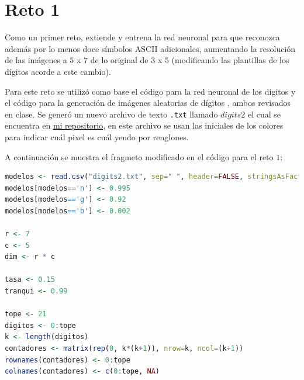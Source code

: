 \documentclass{article}
\begin{document}
\section{Reto 1}
Como un primer reto, extiende y entrena la red neuronal para que reconozca además por lo menos doce símbolos ASCII adicionales, aumentando la resolución de las imágenes a $5$ x $7$ de lo original de $3$ x $5$  (modificando las plantillas de los dígitos acorde a este cambio).
\bigskip

Para este reto se utilizó como base el código para la red neuronal de los digitos \citep{1} y el código para la generación de imágenes aleatorias de dígitos \citep{4}, ambos revisados en clase. Se generó un nuevo archivo de texto \texttt{.txt} llamado $digits2$ el cual se encuentra en \href{https://github.com/nataliaperez0/Simulation/tree/main/Tarea12}{mi repositorio}, en este archivo se usan las iniciales de los colores para indicar cuál pixel es cuál yendo por renglones.
\bigskip

A continuación se muestra el fragmeto modificado en el código para el reto $1$: 

\lstset{style=mystyle}
\begin{lstlisting}[language=R, caption= Fragmento del código modificado para el reto $1$.]
modelos <- read.csv("digits2.txt", sep=" ", header=FALSE, stringsAsFactors=F)
modelos[modelos=='n'] <- 0.995
modelos[modelos=='g'] <- 0.92
modelos[modelos=='b'] <- 0.002

r <- 7
c <- 5
dim <- r * c

tasa <- 0.15
tranqui <- 0.99

tope <- 21
digitos <- 0:tope
k <- length(digitos)
contadores <- matrix(rep(0, k*(k+1)), nrow=k, ncol=(k+1))
rownames(contadores) <- 0:tope
colnames(contadores) <- c(0:tope, NA)
\end{lstlisting}


\end{document}
